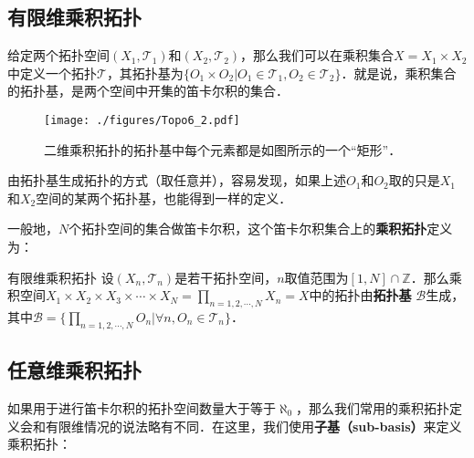 

\subsection{有限维乘积拓扑}

给定两个拓扑空间$(X_1, \mathcal{T}_1)$和$(X_2, \mathcal{T}_2)$，那么我们可以在乘积集合$X=X_1\times X_2$中定义一个拓扑$\mathcal{T}$，其拓扑基为$\{O_1\times O_2|O_1\in\mathcal{T_1}, O_2\in\mathcal{T_2}\}$．就是说，乘积集合的拓扑基，是两个空间中开集的笛卡尔积的集合．

\begin{figure}[ht]
\centering
\texttt{[image: ./figures/Topo6\_2.pdf]}
\caption{二维乘积拓扑的拓扑基中每个元素都是如图所示的一个“矩形”．} \label{Topo6_fig2}
\end{figure}

由拓扑基生成拓扑的方式（取任意并），容易发现，如果上述$O_1$和$O_2$取的只是$X_1$和$X_2$空间的某两个拓扑基，也能得到一样的定义．

一般地，$N$个拓扑空间的集合做笛卡尔积，这个笛卡尔积集合上的\textbf{乘积拓扑}定义为：

\begin{definition}{有限维乘积拓扑}
设$(X_n, \mathcal{T}_n)$是若干拓扑空间，$n$取值范围为$[1, N]\cap\mathbb{Z}$．那么乘积空间$X_1\times X_2\times X_3\times\cdots\times X_N=\prod\limits_{n=1,2,\cdots,N}X_n=X$中的拓扑由\textbf{拓扑基} $\mathcal{B}$生成，其中$\mathcal{B}=\{\prod\limits_{n=1,2,\cdots,N}O_n|\forall n, O_n\in\mathcal{T}_n\}$．
\end{definition}

\subsection{任意维乘积拓扑}

如果用于进行笛卡尔积的拓扑空间数量大于等于$\aleph_0$，那么我们常用的乘积拓扑定义会和有限维情况的说法略有不同．在这里，我们使用\textbf{子基（sub-basis）}来定义乘积拓扑：

